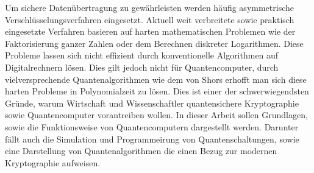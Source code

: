 Um sichere Daten\"ubertragung zu gew\"ahrleisten werden h\"aufig asymmetrische Verschl\"usselungsverfahren eingesetzt. Aktuell weit verbreitete sowie praktisch eingesetzte Verfahren basieren auf harten mathematischen Problemen wie der Faktorisierung ganzer Zahlen oder dem Berechnen diskreter Logarithmen. Diese Probleme lassen sich nicht effizient durch konventionelle Algorithmen auf Digitalrechnern l\"osen. Dies gilt jedoch nicht f\"ur Quantencomputer, durch vielversprechende Quantenalgorithmen wie dem von Shors erhofft man sich diese harten Probleme in Polynomialzeit zu l\"osen. Dies ist einer der schwerwiegendsten Gr\"unde, warum Wirtschaft und Wissenschaftler quantensichere Kryptographie sowie Quantencomputer vorantreiben wollen. In dieser Arbeit sollen Grundlagen, sowie die Funktionsweise von Quantencomputern dargestellt werden. Darunter f\"allt auch die Simulation und Programmeirung von Quantenschaltungen, sowie eine Darstellung von Quantenalgorithmen die einen Bezug zur modernen Kryptographie aufweisen.
